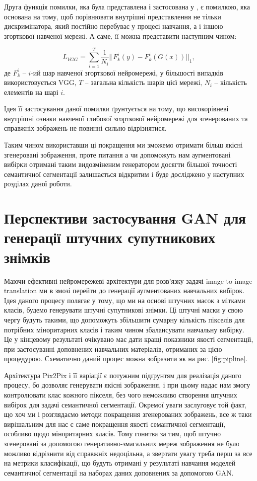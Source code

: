 Друга функція помилки, яка була представлена і застосована у
\cite{pix2pixHD}, є помилкою, яка основана на тому, щоб
порівнювати внутрішні представлення не тільки дискримінатора,
який постійно перебуває у процесі навчання, а і іншою згорткової
навченої мережі. А саме, її можна представити наступним чином:

\begin{equation} \label{eq:perceptual_loss}
    L_{VGG} = \sum\limits_{i=1}^T
    \frac{1}{N_i} || F^i_k(y) - F^i_k(G(x)) ||_1,
\end{equation}
де $F^i_k$ -- $i$-ий шар навченої згорткової нейромережі,
у більшості випадків використовується VGG,
$T$ -- загальна кількість шарів цієї мережі,
$N_i$ -- кількість елементів на шарі $i$.

Ідея її застосування даної помилки ґрунтується на тому, що
високорівневі внутрішні ознаки навченої глибокої згорткової
нейромережі для згенерованих та справжніх зображень не повинні
сильно відрізнятися.

Таким чином використавши ці покращення ми зможемо
отримати більш якісні згенеровані зображення, проте питання а
чи допоможуть нам аугментовані вибірки отримані таким видозміненим
генератором досягти більшої точності семантичної сегментації залишається
відкритим і буде досліджено у наступних розділах даної роботи.

\section{Перспективи застосування GAN для генерації штучних супутникових знімків}

Маючи ефективні нейромережеві архітектури для розв'язку задачі
image-to-image translation ми в змозі перейти до
генерації аугментованих навчальних вибірок. Ідея даного процесу
полягає у тому, що ми на основі штучних масок з мітками класів,
будемо генерувати штучні супутникові знімки. Ці штучні маски у
свою чергу будуть такими, що допоможуть збільшити сумарну кількість
пікселів для потрібних міноритарних класів і таким чином збалансувати
навчальну вибірку. Це у кінцевому результаті очікувано має дати
кращі показники якості сегментації, при застосуванні доповнених
навчальних матеріалів, отриманих за цією процедурою. Схематично даний процес
можна зобразити як на рис. \ref{fig:pipline}.

Архітектура Pix2Pix і її варіації є потужним підґрунтям для
реалізація даного процесу, бо дозволяє генерувати якісні зображення,
і при цьому надає нам змогу контролювати клас кожного пікселя,
без чого неможливо створення штучних вибірок для задачі семантичної сегментації.
Окремої уваги заслуговує той факт, що хоч ми і розглядаємо
методи покращення згенерованих зображень, все ж таки
вирішальним для нас є саме покращення якості семантичної сегментації,
особливо щодо міноритарних класів. Тому гонитва за тим, щоб
штучно згенеровані за допомогою генеративно-змагальних мереж
зображення не було можливо відрізнити від справжніх недоцільна,
а звертати увагу треба перш за все на метрики класифікації,
що будуть отримані у результаті навчання моделей семантичної
сегментації на наборах даних доповнених за допомогою GAN.

